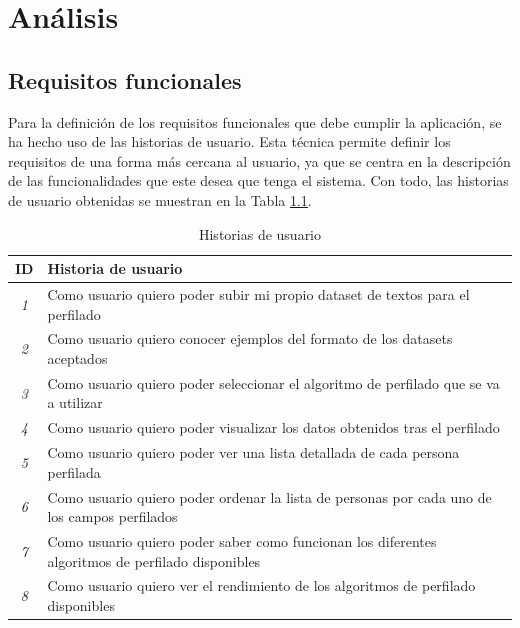 \chapter{Análisis}
\label{chap:analisis}

\section{Requisitos funcionales}
\label{sec:analisis_requisitos_funcionales}

Para la definición de los requisitos funcionales que debe cumplir la aplicación, se ha hecho uso de las historias de usuario.
Esta técnica permite definir los requisitos de una forma más cercana al usuario, ya que se centra en la descripción
de las funcionalidades que este desea que tenga el sistema. Con todo, las historias de usuario obtenidas se muestran en la
Tabla \ref{tab:historias_usuario}.

\bigskip
\begin{table}[H]
  \centering
  \begin{tabular}{c|p{11cm}}
		\rowcolor{udcpink!25}
		\textbf{ID} & \textbf{Historia de usuario} \\\hline
		\small \textit{1} & \small Como usuario quiero poder subir mi propio dataset de textos para el perfilado \\
		\small \textit{2} & \small Como usuario quiero conocer ejemplos del formato de los datasets aceptados \\
		\small \textit{3} & \small Como usuario quiero poder seleccionar el algoritmo de perfilado que se va a utilizar \\
		\small \textit{4} & \small Como usuario quiero poder visualizar los datos obtenidos tras el perfilado \\
		\small \textit{5} & \small Como usuario quiero poder ver una lista detallada de cada persona perfilada \\
		\small \textit{6} & \small Como usuario quiero poder ordenar la lista de personas por cada uno de los campos perfilados \\
		\small \textit{7} & \small Como usuario quiero poder saber como funcionan los diferentes algoritmos de perfilado disponibles \\
		\small \textit{8} & \small Como usuario quiero ver el rendimiento de los algoritmos de perfilado disponibles \\
  \end{tabular}
  \caption{Historias de usuario}
  \label{tab:historias_usuario}
\end{table}

